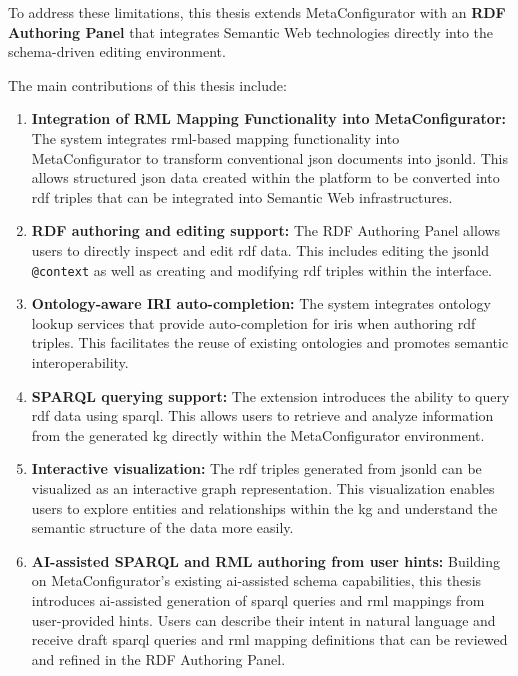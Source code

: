 To address these limitations, this thesis extends MetaConfigurator with an \textbf{RDF Authoring Panel} that integrates Semantic Web technologies directly into the schema-driven editing environment. 

\newpage

The main contributions of this thesis include:

\begin{enumerate}
    \item \textbf{Integration of RML Mapping Functionality into MetaConfigurator:}  
    The system integrates \gls{rml}-based mapping functionality into MetaConfigurator to transform conventional \gls{json} documents into \gls{jsonld}. This allows structured \gls{json} data created within the platform to be converted into \gls{rdf} triples that can be integrated into Semantic Web infrastructures.

    \item \textbf{RDF authoring and editing support:}  
    The RDF Authoring Panel allows users to directly inspect and edit \gls{rdf} data. This includes editing the \gls{jsonld} \texttt{@context} as well as creating and modifying \gls{rdf} triples within the interface.

    \item \textbf{Ontology-aware IRI auto-completion:}  
    The system integrates ontology lookup services that provide auto-completion for \glspl{iri} when authoring \gls{rdf} triples. This facilitates the reuse of existing ontologies and promotes semantic interoperability.

    \item \textbf{SPARQL querying support:}  
    The extension introduces the ability to query \gls{rdf} data using \gls{sparql}. This allows users to retrieve and analyze information from the generated \gls{kg} directly within the MetaConfigurator environment.

    \item \textbf{Interactive  visualization:}  
    The \gls{rdf} triples generated from \gls{jsonld} can be visualized as an interactive graph representation. This visualization enables users to explore entities and relationships within the \gls{kg} and understand the semantic structure of the data more easily.

    \item \textbf{AI-assisted SPARQL and RML authoring from user hints:}  
    Building on MetaConfigurator's existing \gls{ai}-assisted schema capabilities, this thesis introduces \gls{ai}-assisted generation of \gls{sparql} queries and \gls{rml} mappings from user-provided hints. Users can describe their intent in natural language and receive draft \gls{sparql} queries and \gls{rml} mapping definitions that can be reviewed and refined in the RDF Authoring Panel.
\end{enumerate}

